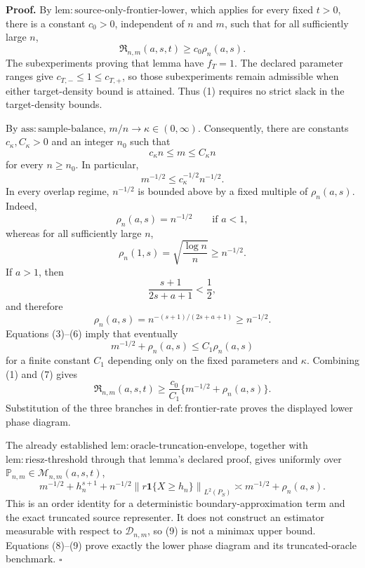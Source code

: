 \textbf{Proof.}
By \(\mathrm{lem:source\text{-}only\text{-}frontier\text{-}lower}\), which applies for every fixed \(t>0\), there is a constant \(c_0>0\), independent of \(n\) and \(m\), such that for all sufficiently large \(n\),
\[
 \mathfrak R_{n,m}(a,s,t)\ge c_0\rho_n(a,s).
\tag{1}
\]
The subexperiments proving that lemma have \(f_T=1\).  The declared parameter ranges give \(c_{T,-}\le1\le c_{T,+}\), so those subexperiments remain admissible when either target-density bound is attained.  Thus (1) requires no strict slack in the target-density bounds.

By \(\mathrm{ass:sample\text{-}balance}\), \(m/n\to\kappa\in(0,\infty)\).  Consequently, there are constants \(c_\kappa,C_\kappa>0\) and an integer \(n_0\) such that
\[
 c_\kappa n\le m\le C_\kappa n
\tag{2}
\]
for every \(n\ge n_0\).  In particular,
\[
 m^{-1/2}\le c_\kappa^{-1/2}n^{-1/2}.
\tag{3}
\]
In every overlap regime, \(n^{-1/2}\) is bounded above by a fixed multiple of \(\rho_n(a,s)\).  Indeed,
\[
 \rho_n(a,s)=n^{-1/2}\qquad\text{if }a<1,
\tag{4}
\]
whereas for all sufficiently large \(n\),
\[
 \rho_n(1,s)=\sqrt{\frac{\log n}{n}}\ge n^{-1/2}.
\tag{5}
\]
If \(a>1\), then
\[
 \frac{s+1}{2s+a+1}<\frac12,
\]
and therefore
\[
 \rho_n(a,s)=n^{-(s+1)/(2s+a+1)}\ge n^{-1/2}.
\tag{6}
\]
Equations (3)--(6) imply that eventually
\[
 m^{-1/2}+\rho_n(a,s)\le C_1\rho_n(a,s)
\tag{7}
\]
for a finite constant \(C_1\) depending only on the fixed parameters and \(\kappa\).  Combining (1) and (7) gives
\[
 \mathfrak R_{n,m}(a,s,t)
 \ge \frac{c_0}{C_1}\{m^{-1/2}+\rho_n(a,s)\}.
\tag{8}
\]
Substitution of the three branches in \(\mathrm{def:frontier\text{-}rate}\) proves the displayed lower phase diagram.

The already established \(\mathrm{lem:oracle\text{-}truncation\text{-}envelope}\), together with \(\mathrm{lem:riesz\text{-}threshold}\) through that lemma's declared proof, gives uniformly over \(\mathbb P_{n,m}\in\mathcal M_{n,m}(a,s,t)\),
\[
 m^{-1/2}+h_n^{s+1}
 +n^{-1/2}\left\|r\mathbf 1\{X\ge h_n\}\right\|_{L^2(P_S)}
 \asymp m^{-1/2}+\rho_n(a,s).
\tag{9}
\]
This is an order identity for a deterministic boundary-approximation term and the exact truncated source representer.  It does not construct an estimator measurable with respect to \(\mathcal D_{n,m}\), so (9) is not a minimax upper bound.  Equations (8)--(9) prove exactly the lower phase diagram and its truncated-oracle benchmark. \(\square\)